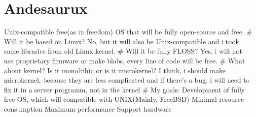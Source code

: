 \hypertarget{andesaurux}{%
\section{Andesaurux}\label{andesaurux}}

Unix-compatible free(as in freedom) OS that will be fully open-source
and free. \# Will it be based on Linux? No, but it will also be
Unix-compatible and i took some libraries from old Linux kernel. \# Will
it be fully FLOSS? Yes, i will not use proprietary firmware or make
blobs, every line of code will be free. \# What about kernel? Is it
monolithic or is it microkernel? I think, i should make microkernel,
because they are less complicated and if there's a bug, i will need to
fix it in a server programm, not in the kernel \# My goals: Development
of fully free OS, which will compatible with UNIX(Mainly, FreeBSD)
Minimal resource consumption Maximum performance Support hardware
